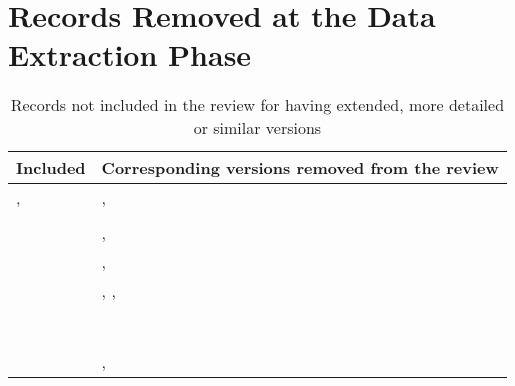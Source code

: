 \section{Records Removed at the Data Extraction Phase}
\label{a1:rmv-records}

\begin{table*}[!h]
  \renewcommand{\arraystretch}{1.25}
  \setlength{\tabcolsep}{3pt}
  \caption[Records not included in the review for having extended, more detailed or similar versions]{Records not included in the review for having extended, more detailed or similar versions}
  \vspace{0.5em}
  \label{tab:a1:rmv-records}
  \centering
  {\scriptsize
  \begin{tabular}{l l}

\hline
\textbf{Included} & \textbf{Corresponding versions removed from the review}\\
\hline
\cite{hochdorfer-et-al:2009:5339626}, \cite{hochdorfer-schlegel:2009} &
\cite{hochdorfer-schlegel:2009:5354433}, \cite{hochdorfer-schlegel:2010:5651229}\\
\cite{dayoub-et-al:2011:013} &
\cite{dayoub-duckett:2008:4650701}\\
\cite{latif-et-al:2012:6385879} &
\cite{latif-et-al:2013:030}, \cite{latif-et-al:2013:0278364913498910}\\
\cite{bacca-et-al:2013:003} &
\cite{bacca-et-al:2010:291}, \cite{bacca-et-al:2011:008}\\
\cite{kawewong-et-al:2013:826410} & 
\cite{kawewong-et-al:2010:2587}, \cite{kawewong-et-al:2011:0278364910371855}, \cite{kawewong-et-al:2011:007}\\
\cite{paul-newman:2013:0278364913509859} &
\cite{paul-newman:2011:5980404}\\
\cite{carlevaris-bianco-et-al:2014:2347571} &
\cite{carlevaris-bianco-eustice:2013:6696478}\\
\cite{neubert-et-al:2015:005} &
\cite{neubert-et-al:2013:6698842}\\
\cite{ozog-et-al:2016:21582} &
\cite{ozog-eustice:2014:6907415}\\
\cite{biswas-veloso:2017:005} &
\cite{biswas-veloso:2014:6907435}\\
\cite{griffith-pradalier:2017:21664} &
\cite{griffith-pradalier:2016:1}\\
\cite{krajník-et-al:2017:2665664} &
\cite{krajník-et-al:2016:7759671}\\
\cite{arroyo-et-al:2018:7} &
\cite{arroyo-et-al:2015:7140088}, \cite{arroyo-et-al:2016:7795672}\\

\end{tabular}}
\end{table*}
